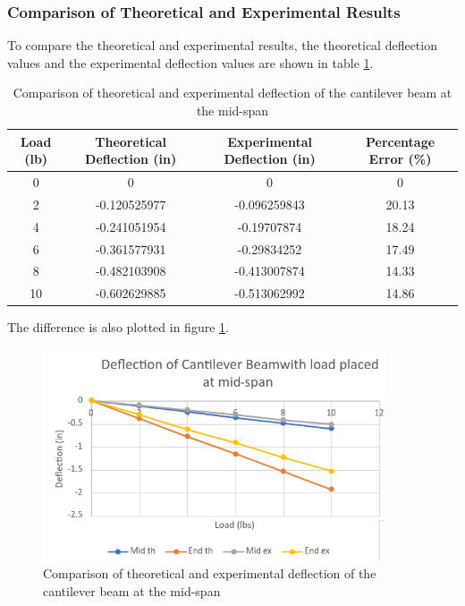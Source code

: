 \documentclass[12pt, titlepage]{article}
\begin{document}
\subsubsection{Comparison of Theoretical and Experimental Results}
To compare the theoretical and experimental results, the theoretical deflection
values and the experimental deflection values are shown in table \ref{tab:ComparisonCantileverBeamMid}.
\begin{table}[H]
  \centering
  \caption{Comparison of theoretical and experimental deflection of the cantilever beam at the mid-span}
  \label{tab:ComparisonCantileverBeamMid}
  \begin{adjustwidth}{-1in}{-1in}
    \begin{tabular}{|c|c|c|c|}
        \hline
        \textbf{Load (lb)} & \textbf{Theoretical Deflection (in)} & \textbf{Experimental Deflection (in)} & \textbf{Percentage Error (\%)} \\
        \hline
        0 & 0 & 0 & 0 \\
        \hline
        2 & -0.120525977 & -0.096259843 & 20.13 \\
        \hline
        4 & -0.241051954 & -0.19707874 & 18.24 \\
        \hline
        6 & -0.361577931 & -0.29834252 & 17.49 \\
        \hline
        8 & -0.482103908 & -0.413007874 & 14.33 \\
        \hline
        10 & -0.602629885 & -0.513062992 & 14.86 \\
        \hline
    \end{tabular}
  \end{adjustwidth}
\end{table}
\newpage
The difference is also plotted in figure \ref{fig:ComparisonCantileverBeamMid}.
\begin{figure}[H]
    \centering
    \includegraphics[width=0.9\textwidth]{./Images/C_M_C.png}
    \caption{Comparison of theoretical and experimental deflection of the cantilever beam at the mid-span}
    \label{fig:ComparisonCantileverBeamMid}
\end{figure}
\newpage
\end{document}
